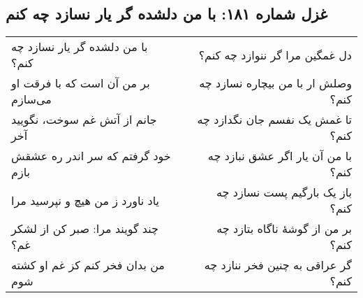 \begin{center}
\section*{غزل شماره ۱۸۱: با من دلشده گر یار نسازد چه کنم}
\label{sec:181}
\begin{longtable}{l p{0.5cm} r}
با من دلشده گر یار نسازد چه کنم؟
&&
دل غمگین مرا گر ننوازد چه کنم؟
\\
بر من آن است که با فرقت او می‌سازم
&&
وصلش ار با من بیچاره نسازد چه کنم؟
\\
جانم از آتش غم سوخت، نگویید آخر
&&
تا غمش یک نفسم جان نگدازد چه کنم؟
\\
خود گرفتم که سر اندر ره عشقش بازم
&&
با من آن یار اگر عشق نبازد چه کنم؟
\\
یاد ناورد ز من هیچ و نپرسید مرا
&&
باز یک بارگیم پست نسازد چه کنم؟
\\
چند گویند مرا: صبر کن از لشکر غم؟
&&
بر من از گوشهٔ ناگاه بتازد چه کنم؟
\\
من بدان فخر کنم کز غم او کشته شوم
&&
گر عراقی به چنین فخر ننازد چه کنم؟
\\
\end{longtable}
\end{center}

